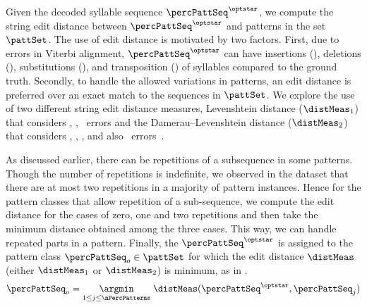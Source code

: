 Given the decoded syllable sequence $\percPattSeq^{\optstar}$, we compute the string edit distance \cite{navarro:01:strDist} between $\percPattSeq^{\optstar}$ and patterns in the set $\pattSet$. The use of edit distance is motivated by two factors. First, due to errors in Viterbi alignment, $\percPattSeq^{\optstar}$ can have insertions (\strInsErr), deletions (\strDelErr), substitutions (\strSubErr), and transposition (\strTrnErr) of syllables compared to the ground truth. Secondly, to handle the allowed variations in patterns, an edit distance is preferred over an exact match to the sequences in $\pattSet$. We explore the use of two different string edit distance measures, Levenshtein distance ($\distMeas_{1}$) that considers \strInsErr, \strDelErr, \strSubErr\ errors and the Damerau–Levenshtein distance ($\distMeas_2$) that considers \strInsErr, \strDelErr, \strSubErr, and also \strTrnErr\ errors~\cite{navarro:01:strDist}. 

As discussed earlier, there can be repetitions of a subsequence in some patterns. Though the number of repetitions is indefinite, we observed in the dataset that there are at most two repetitions in a majority of pattern instances. Hence for the pattern classes that allow repetition of a sub-sequence, we compute the edit distance for the cases of zero, one and two repetitions and then take the minimum distance obtained among the three cases. This way, we can handle repeated parts in a pattern. Finally, the $\percPattSeq^{\optstar}$ is assigned to the pattern class $\percPattSeq_o \in \pattSet$ for which the edit distance $\distMeas$ (either $\distMeas_1$ or $\distMeas_2$) is minimum, as in .  
\begin{equation}
\percPattSeq_o = \underset{1 \leq j \leq \nPercPatterns}{\argmin}\;\distMeas(\percPattSeq^{\optstar},\percPattSeq_j) \label{eqn:bo:pattclassify}
\end{equation}
%
